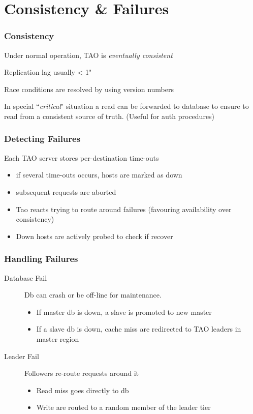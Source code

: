 \section{Consistency \& Failures}
\begin{frame}[t]\frametitle{Consistency}
	Under normal operation, TAO is \emph{eventually consistent}

	Replication lag usually < 1"

	Race conditions are resolved by using version numbers

	In special ``\emph{critical}" situation a read can be forwarded to database to ensure to read from a consistent source of truth. (Useful for auth procedures)

\end{frame}

\begin{frame}[t]\frametitle{Detecting Failures}
    Each TAO server stores per-destination time-outs
    \begin{itemize}
    	\item if several time-outs occurs, hosts are marked as down
    	\item subsequent requests are aborted
    	\item Tao reacts trying to route around failures (favouring availability over consistency)
    	\item Down hosts are actively probed to check if recover
    \end{itemize}
\end{frame}

\begin{frame}[c]\frametitle{Handling Failures}
    \begin{description}
    	\item[Database Fail] Db can crash or be off-line for maintenance. 
    	\begin{itemize}
    		\item If master db is down, a slave is promoted to new master
    		\item If a slave db is down, cache miss are redirected to TAO leaders in master region
    	\end{itemize}
    	\item[Leader Fail] Followers re-route requests around it
    	\begin{itemize}
    		\item Read miss goes directly to db
    		\item Write are routed to a random member of the leader tier
    	\end{itemize}
    \end{description}
\end{frame}

